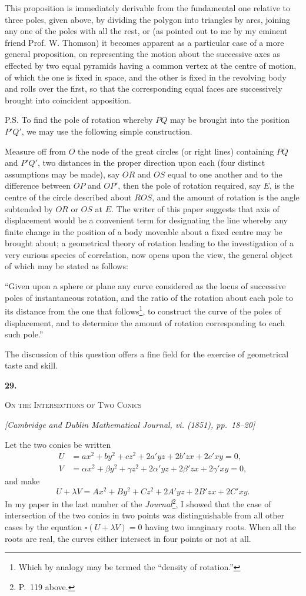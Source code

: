\documentclass[11pt]{article}
\newcommand{\paperhead}[3]{%
  \clearpage
  \begin{center}
  {\Large\bfseries #1.}\par\vspace{0.85em}
  {\large\scshape #2}\par\vspace{0.6em}
  {\itshape [#3]}\par
  \end{center}\vspace{0.4em}}
\newcommand{\sourcepage}[1]{\marginpar{\scriptsize p.~#1}}
\begin{document}
{{\sourcepage{161}
This proposition is immediately derivable from the fundamental one relative to three poles, given above, by dividing the polygon into triangles by arcs, joining any one of the poles with all the rest, or (as pointed out to me by my eminent friend Prof. W. Thomson) it becomes apparent as a particular case of a more general proposition, on representing the motion about the successive axes as effected by two equal pyramids having a common vertex at the centre of motion, of which the one is fixed in space, and the other is fixed in the revolving body and rolls over the first, so that the corresponding equal faces are successively brought into coincident apposition.

P.S. To find the pole of rotation whereby $PQ$ may be brought into the position $P'Q'$, we may use the following simple construction.

Measure off from $O$ the node of the great circles (or right lines) containing $PQ$ and $P'Q'$, two distances in the proper direction upon each (four distinct assumptions may be made), say $OR$ and $OS$ equal to one another and to the difference between $OP$ and $OP'$, then the pole of rotation required, say $E$, is the centre of the circle described about $ROS$, and the amount of rotation is the angle subtended by $OR$ or $OS$ at $E$. The writer of this paper suggests that axis of displacement would be a convenient term for designating the line whereby any finite change in the position of a body moveable about a fixed centre may be brought about; a geometrical theory of rotation leading to the investigation of a very curious species of correlation, now opens upon the view, the general object of which may be stated as follows:

``Given upon a sphere or plane any curve considered as the locus of successive poles of instantaneous rotation, and the ratio of the rotation about each pole to its distance from the one that follows\footnote{Which by analogy may be termed the ``density of rotation.''}, to construct the curve of the poles of displacement, and to determine the amount of rotation corresponding to each such pole.''

The discussion of this question offers a fine field for the exercise of geometrical taste and skill.

\paperhead{29}{On the Intersections of Two Conics}{Cambridge and Dublin Mathematical Journal, vi. (1851), pp.~18--20}

\sourcepage{162}
Let the two conics be written
\[
\begin{aligned}
 U&=ax^2+by^2+cz^2+2a'yz+2b'zx+2c'xy=0,\\
 V&=\alpha x^2+\beta y^2+\gamma z^2+2\alpha'yz+2\beta'zx+2\gamma'xy=0,
\end{aligned}
\]
and make
\[
 U+\lambda V=Ax^2+By^2+Cz^2+2A'yz+2B'zx+2C'xy.
\]
In my paper in the last number of the \emph{Journal}\footnote{P.~119 above.}, I showed that the case of intersection of the two conics in two points was distinguishable from all other cases by the equation $\square(U+\lambda V)=0$ having two imaginary roots. When all the roots are real, the curves either intersect in four points or not at all.

}}
\end{document}
